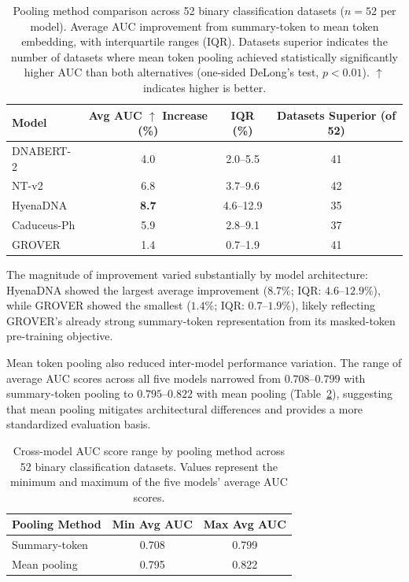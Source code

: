 \documentclass[11pt]{article}
\begin{document}
\begin{table}[htbp]
\centering
\caption{Pooling method comparison across 52 binary classification datasets ($n = 52$ per model). Average AUC improvement from summary-token to mean token embedding, with interquartile ranges (IQR). Datasets superior indicates the number of datasets where mean token pooling achieved statistically significantly higher AUC than both alternatives (one-sided DeLong's test, $p < 0.01$). $\uparrow$ indicates higher is better.}
\label{tab:pooling_results}
\begin{tabular}{lccc}
\toprule
\textbf{Model} & \textbf{Avg AUC $\uparrow$ Increase (\%)} & \textbf{IQR (\%)} & \textbf{Datasets Superior (of 52)} \\
\midrule
DNABERT-2 & 4.0 & 2.0--5.5 & 41 \\
NT-v2 & 6.8 & 3.7--9.6 & 42 \\
HyenaDNA & \textbf{8.7} & 4.6--12.9 & 35 \\
Caduceus-Ph & 5.9 & 2.8--9.1 & 37 \\
GROVER & 1.4 & 0.7--1.9 & 41 \\
\bottomrule
\end{tabular}
\end{table}

The magnitude of improvement varied substantially by model architecture: HyenaDNA showed the largest average improvement ($8.7\%$; IQR: $4.6$--$12.9\%$), while GROVER showed the smallest ($1.4\%$; IQR: $0.7$--$1.9\%$), likely reflecting GROVER's already strong summary-token representation from its masked-token pre-training objective.

Mean token pooling also reduced inter-model performance variation. The range of average AUC scores across all five models narrowed from $0.708$--$0.799$ with summary-token pooling to $0.795$--$0.822$ with mean pooling (Table~\ref{tab:pooling_range}), suggesting that mean pooling mitigates architectural differences and provides a more standardized evaluation basis.

\begin{table}[htbp]
\centering
\caption{Cross-model AUC score range by pooling method across 52 binary classification datasets. Values represent the minimum and maximum of the five models' average AUC scores.}
\label{tab:pooling_range}
\begin{tabular}{lcc}
\toprule
\textbf{Pooling Method} & \textbf{Min Avg AUC} & \textbf{Max Avg AUC} \\
\midrule
Summary-token & 0.708 & 0.799 \\
Mean pooling & 0.795 & 0.822 \\
\bottomrule
\end{tabular}
\end{table}
\end{document}
